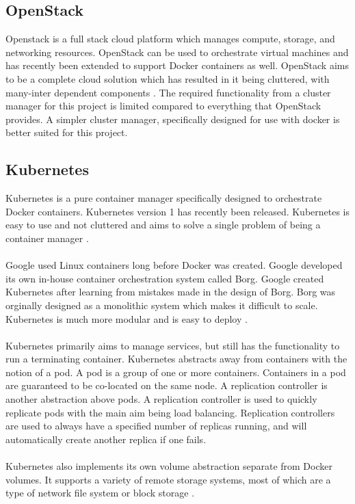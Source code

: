 \documentclass{sig-alternate-05-2015}
\begin{document}
\subsection{OpenStack}
Openstack is a full stack cloud platform which manages compute, storage, and networking resources. OpenStack can be used to orchestrate virtual machines and has recently been extended to support Docker containers as well. OpenStack aims to be a complete cloud solution which has resulted in it being cluttered, with many-inter dependent components \cite{affetti2015adock}. The required functionality  from a cluster manager for this project is limited compared to everything that OpenStack provides. A simpler cluster manager, specifically designed for use with docker is better suited for this project.


\subsection{Kubernetes}
Kubernetes is a pure container manager specifically designed to orchestrate Docker containers. Kubernetes version 1 has recently been released. Kubernetes is easy to use and not cluttered and aims to solve a single problem of being a container manager \cite{googleborg}. 
\\\\
Google used Linux containers long before Docker was created. Google developed its own in-house container orchestration system called Borg. Google created Kubernetes after learning from mistakes made in the design of Borg. Borg was orginally designed as a monolithic system which makes it difficult to scale. Kubernetes is much more modular and is easy to deploy \cite{googleborg}.
\\\\
Kubernetes primarily aims to manage services, but still has the functionality to run a terminating container. Kubernetes abstracts away from containers with the notion of a pod. A pod is a group of one or more containers. Containers in a pod are guaranteed to be co-located on the same node. A replication controller is another abstraction above pods. A replication controller is used to quickly replicate pods with the main aim being load balancing. Replication controllers are used to always have a specified number of replicas running, and will automatically create another replica if one fails.
\\\\
Kubernetes also implements its own volume abstraction separate from Docker volumes. It supports a variety of remote storage systems, most of which are a type of network file system or block storage \cite{kubernetesreadme}.
\end{document}
